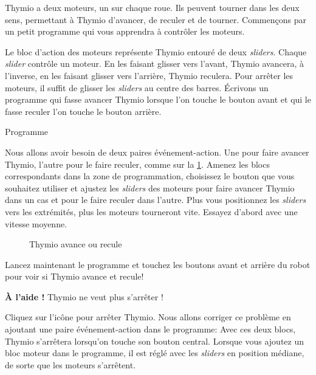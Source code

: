 \label{c.moving}


Thymio a deux moteurs, un sur chaque roue.
Ils peuvent tourner dans les deux sens, permettant à Thymio d'avancer, de reculer et de tourner. Commençons par un petit programme qui vous apprendra à contrôler les moteurs.

Le bloc d'action des moteurs  représente Thymio entouré de deux \textit{sliders}.
Chaque \textit{slider} contrôle un moteur.
En les faisant glisser vers l'avant, Thymio avancera, à l'inverse, en les faisant glisser vers l'arrière, Thymio reculera.
Pour arrêter les moteurs, il suffit de glisser les \textit{sliders} au centre des barres.
Écrivons un programme qui fasse avancer Thymio lorsque l'on touche le bouton avant et qui le fasse reculer l'on touche le bouton arrière.

{\raggedleft \hfill Programme }

Nous allons avoir besoin de deux paires événement-action. Une pour faire avancer Thymio, l'autre pour le faire reculer, comme sur la \cref{fig.nostop}. Amenez les blocs correspondants dans la zone de programmation, choisissez le bouton que vous souhaitez utiliser et ajustez les \textit{sliders} des moteurs pour faire avancer Thymio dans un cas et pour le faire reculer dans l'autre. Plus vous positionnez les \textit{sliders} vers les extrémités, plus les moteurs tourneront vite. Essayez d'abord avec une vitesse moyenne.

\begin{figure}
\begin{center}
\caption{Thymio avance ou recule}\label{fig.nostop}
\end{center}
\end{figure}

Lancez maintenant le programme et touchez les boutons avant et arrière du robot pour voir si Thymio avance et recule!


\textbf{À l'aide !} Thymio ne veut plus s'arrêter !

Cliquez sur l'icône  pour arrêter Thymio.
Nous allons corriger ce problème en ajoutant une paire événement-action dans le programme: 
Avec ces deux blocs, Thymio s'arrêtera lorsqu'on touche son bouton central.
Lorsque vous ajoutez un bloc moteur dans le programme, il est réglé avec les \textit{sliders} en position médiane, de sorte que les moteurs s'arrêtent.

